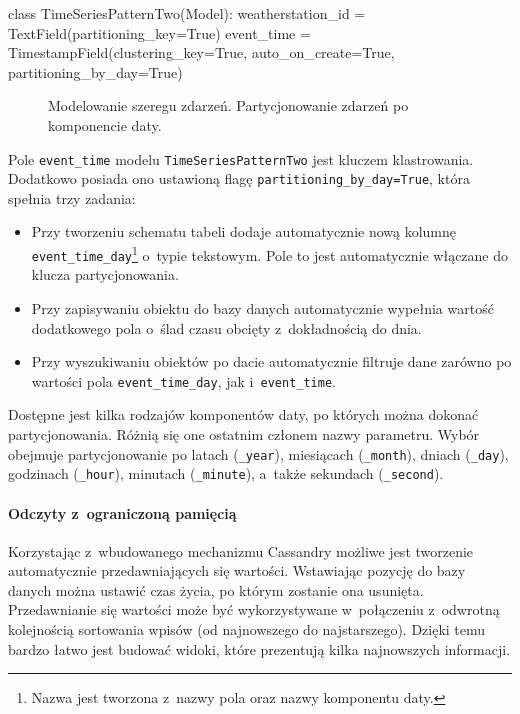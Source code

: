 \begin{verbbox}[\footnotesize]
class TimeSeriesPatternTwo(Model):
    weatherstation_id = TextField(partitioning_key=True)
    event_time = TimestampField(clustering_key=True, 
                                auto_on_create=True, 
                                partitioning_by_day=True)
\end{verbbox}

\begin{figure}[ht!]
	\centering
	\theverbbox
	\caption{Modelowanie szeregu zdarzeń. Partycjonowanie zdarzeń po komponencie daty.}
	\label{lst:time_series_modeling_two}
\end{figure}

Pole \verb+event_time+ modelu \verb+TimeSeriesPatternTwo+ jest kluczem klastrowania. Dodatkowo posiada ono ustawioną flagę \verb+partitioning_by_day=True+, która spełnia trzy zadania:

\begin{itemize}
	\item Przy tworzeniu schematu tabeli dodaje automatycznie nową kolumnę \verb+event_time_day+\footnote{Nazwa jest tworzona z~nazwy pola oraz nazwy komponentu daty.} o~typie tekstowym. Pole to jest automatycznie włączane do klucza partycjonowania.
	\item Przy zapisywaniu obiektu do bazy danych automatycznie wypełnia wartość dodatkowego pola o~ślad czasu obcięty z~dokładnością do dnia.
	\item Przy wyszukiwaniu obiektów po dacie automatycznie filtruje dane zarówno po wartości pola \verb+event_time_day+, jak i~\verb+event_time+.
\end{itemize}

Dostępne jest kilka rodzajów komponentów daty, po których można dokonać partycjonowania. Różnią się one ostatnim członem nazwy parametru. Wybór obejmuje partycjonowanie po latach (\verb+_year+), miesiącach (\verb+_month+), dniach (\verb+_day+), godzinach (\verb+_hour+), minutach (\verb+_minute+), a~także sekundach (\verb+_second+).

\paragraph{Odczyty z~ograniczoną pamięcią}

Korzystając z~wbudowanego mechanizmu Cassandry możliwe jest tworzenie automatycznie przedawniających się wartości. Wstawiając pozycję do bazy danych można ustawić czas życia, po którym zostanie ona usunięta. Przedawnianie się wartości może być wykorzystywane w~połączeniu z~odwrotną kolejnością sortowania wpisów (od najnowszego do najstarszego). Dzięki temu bardzo łatwo jest budować widoki, które prezentują kilka najnowszych informacji.

